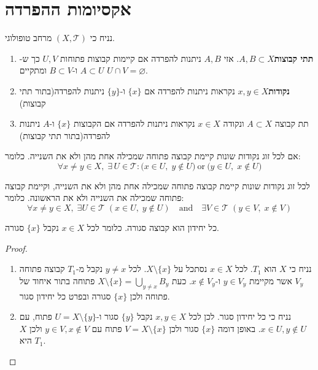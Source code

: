 \documentclass{tstextbook}
\begin{document}
\section{אקסיומות ההפרדה}

נניח כי \((X,\mathcal{T})\) מרחב טופולוגי.

\begin{definition}
  \begin{enumerate}
    \item \textbf{תתי קבוצות}\(A,B \subset X\). אזי \(A,B\) ניתנות להפרדה אם קיימות קבוצות פתוחות \(U,V\) כך ש-\(A\subset U\) ו-\(B \subset V\) ומתקיים \(U \cap V = \varnothing\). 


    \item \textbf{נקודות}\(x,y \in X\) נקראות ניתנות להפרדה אם \(\{ x \}\) ו-\(\{ y \}\) ניתנות להפרדה(בתור תתי קבוצות) 


    \item תת קבוצה \(A \subset X\) ונקודה \(x \in X\) נקראות ניתנות להפרדה אם הקבוצות \(\{ x \}\) ו-\(A\) ניתנות להפרדה(בתור תתי קבוצות) 


  \end{enumerate}
\end{definition}
\begin{definition}
אם לכל זוג נקודות שונות קיימת קבוצה פתוחה שמכילה אחת מהן ולא את השנייה. כלומר:
$$\forall x\neq y\in X,\;\exists\,U\in{\mathcal{T}}:{\big(}x\in U,\;y\notin U{\big)}{\mathrm{~or~}}{\big(}y\in U,\;x\notin U{\big)}$$

\end{definition}
\begin{definition}
לכל זוג נקודות שונות קיימת קבוצה פתוחה שמכילה אחת מהן ולא את השנייה, וקיימת קבוצה פתוחה שמכילה את השנייה ולא את הראשונה. כלומר:
$$\forall x\neq y\in X,\;\exists U\in{\mathcal{T}}\;(x\in U,\;y\notin U)\quad{\mathrm{and}}\quad\exists V\in{\mathcal{T}}\;(y\in V,\;x\notin V)$$

\end{definition}
\begin{proposition}
כל יחידון הוא קבוצה סגורה. כלומר לכל \(x \in X\) נקבל \(\{ x \}\) סגורה.

\end{proposition}
\begin{proof}
  \begin{enumerate}
    \item נניח כי \(X\) הוא \(T_{1}\). לכל \(x \in X\) נסתכל על \(X \setminus \{  x \}\). לכל \(y \neq x\) נקבל מ-\(T_{1}\) קבוצה פתוחה \(V_{y}\) אשר מקיימת \(y \in V_{y}\) ו-\(x \not\in V_{y}\). כעת \(X\setminus \{ x \}=\bigcup_{y\neq x}B_{y}\) פתוחה בתור איחוד של פתוחה ולכן \(\{ x \}\) סגורה ובפרט כל יחידון סגור. 


    \item נניח כי כל יחידון סגור. לכן לכל \(x,y \in X\) נקבל \(\{ y \}\) סגור ו-\(U=X\setminus \{  y \}\) פתוח, עם \(x \in U,y\not\in U\). באופן דומה \(\{ x \}\) סגור ולכן \(V=X\setminus \{ x \}\) פתוח עם \(y\in V,x\not\in V\) ולכן \(X\) היא \(T_{1}\). 


  \end{enumerate}
\end{proof}
\end{document}
